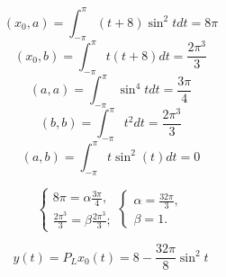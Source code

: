 \documentclass[12pt, a4paper]{article}
\begin{document}
\[(x_0, a) = \int_{ - \pi}^{\pi} (t + 8) \sin^2t  dt = 8 \pi \]
\[(x_0, b) = \int_{ -\pi}^{\pi} t(t + 8)dt = \frac{2 \pi^3}{3} \]
\[(a, a) = \int_{-\pi}^{\pi}\sin^4 t dt = \frac{3\pi}{4}\]
\[(b, b) = \int_{-\pi}^{\pi}t^2 dt = \frac{2 \pi^3}{3}\]
\[(a, b) = \int_{ - \pi}^{\pi} t \sin^2 (t) dt = 0\]

\[
  \begin{cases}
    8\pi = \alpha \frac{3\pi}{4},\\
    \frac{2\pi^3}{3} = \beta \frac{2\pi^3}{3};
  \end{cases}
  \begin{cases}
    \alpha = \frac{32\pi}{3},\\
    \beta = 1.
  \end{cases}
\]

\[ y(t) = P_L x_0(t) = 8 - \frac{32\pi }{8} \sin^2 t \]
\end{document}
